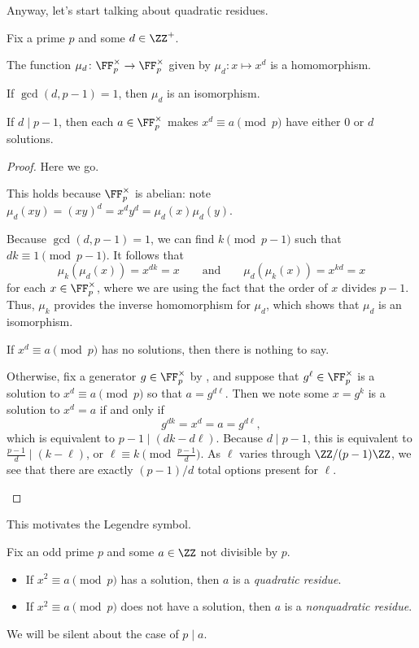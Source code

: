 \documentclass[../notes.tex]{subfiles}
\begin{document}
Anyway, let's start talking about quadratic residues.
\begin{corollary}
	Fix a prime $p$ and some $d\in\ZZ^+$.
	\begin{listalph}
		\item The function $\mu_d\colon\FF_p^\times\to\FF_p^\times$ given by $\mu_d\colon x\mapsto x^d$ is a homomorphism.
		\item If $\gcd(d,p-1)=1$, then $\mu_d$ is an isomorphism.
		\item If $d\mid p-1$, then each $a\in\FF_p^\times$ makes $x^d\equiv a\pmod p$ have either $0$ or $d$ solutions.
	\end{listalph}
\end{corollary}
\begin{proof}
	Here we go.
	\begin{listalph}
		\item This holds because $\FF_p^\times$ is abelian: note $\mu_d(xy)=(xy)^d=x^dy^d=\mu_d(x)\mu_d(y)$.
		\item Because $\gcd(d,p-1)=1$, we can find $k\pmod{p-1}$ such that $dk\equiv1\pmod{p-1}$. It follows that
		\[\mu_k(\mu_d(x))=x^{dk}=x\qquad\text{and}\qquad\mu_d(\mu_k(x))=x^{kd}=x\]
		for each $x\in\FF_p^\times$, where we are using the fact that the order of $x$ divides $p-1$. Thus, $\mu_k$ provides the inverse homomorphism for $\mu_d$, which shows that $\mu_d$ is an isomorphism.
		\item If $x^d\equiv a\pmod p$ has no solutions, then there is nothing to say.
		
		Otherwise, fix a generator $g\in\FF_p^\times$ by , and suppose that $g^\ell\in\FF_p^\times$ is a solution to $x^d\equiv a\pmod p$ so that $a=g^{d\ell}$. Then we note some $x=g^k$ is a solution to $x^d=a$ if and only if
		\[g^{dk}=x^d=a=g^{d\ell},\]
		which is equivalent to $p-1\mid(dk-d\ell)$. Because $d\mid p-1$, this is equivalent to $\frac{p-1}d\mid (k-\ell)$, or $\ell\equiv k\pmod{\frac{p-1}d}$. As $\ell$ varies through $\ZZ/(p-1)\ZZ$, we see that there are exactly $(p-1)/d$ total options present for $\ell$.
		\qedhere
	\end{listalph}
\end{proof}
This motivates the Legendre symbol.
\begin{definition}
	Fix an odd prime $p$ and some $a\in\ZZ$ not divisible by $p$.
	\begin{itemize}
		\item If $x^2\equiv a\pmod p$ has a solution, then $a$ is a \textit{quadratic residue}.
		\item If $x^2\equiv a\pmod p$ does not have a solution, then $a$ is a \textit{nonquadratic residue}.
	\end{itemize}
	We will be silent about the case of $p\mid a$.
\end{definition}
\end{document}
